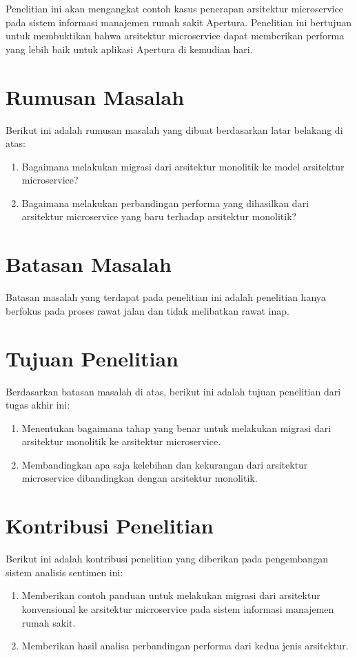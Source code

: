 Penelitian ini akan mengangkat contoh kasus penerapan arsitektur microservice pada sistem informasi manajemen rumah sakit Apertura. Penelitian ini bertujuan untuk membuktikan bahwa arsitektur microservice dapat memberikan performa yang lebih baik untuk aplikasi Apertura di kemudian hari.
\section{Rumusan Masalah}
Berikut ini adalah rumusan masalah yang dibuat berdasarkan latar belakang di atas:
\begin {enumerate}[nolistsep, leftmargin=0.5cm]
\item Bagaimana melakukan migrasi dari arsitektur monolitik ke model arsitektur microservice?
\item Bagaimana melakukan perbandingan performa yang dihasilkan dari arsitektur microservice yang baru terhadap arsitektur monolitik?
\end{enumerate}

\section{Batasan Masalah}
Batasan masalah yang terdapat pada penelitian ini adalah penelitian hanya berfokus pada proses rawat jalan dan tidak melibatkan rawat inap. 

\section{Tujuan Penelitian}
Berdasarkan batasan masalah di atas, berikut ini adalah tujuan penelitian dari tugas akhir ini:
\begin{enumerate}[nolistsep,leftmargin=0.5cm]
\item Menentukan bagaimana tahap yang benar untuk melakukan migrasi dari arsitektur monolitik ke arsitektur microservice.
\item Membandingkan apa saja kelebihan dan kekurangan dari arsitektur microservice dibandingkan dengan arsitektur monolitik.
\end{enumerate}

\section{Kontribusi Penelitian}
Berikut ini adalah kontribusi penelitian yang diberikan pada pengembangan sistem analisis sentimen ini:
\begin{enumerate}[nolistsep,leftmargin=0.5cm]
\item Memberikan contoh panduan untuk melakukan migrasi dari arsitektur konvensional ke arsitektur microservice pada sistem informasi manajemen rumah sakit.
\item Memberikan hasil analisa perbandingan performa dari kedua jenis arsitektur.
\end{enumerate}

